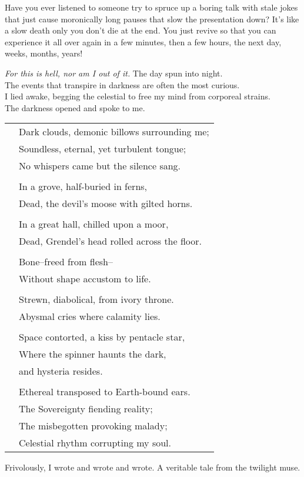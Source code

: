Have you ever listened to someone try to spruce up
a boring talk with stale jokes that just cause
moronically long pauses that slow the presentation
down?  It's like a slow death only you don't die at
the end.  You just revive so that you can experience
it all over again in a few minutes, then a few hours,
the next day, \large{}weeks, \Large{}months, \LARGE{}years!\normalsize
\VV


\textit{For this is hell, nor am I out of it.}
\lhoarb
\noindent
The day spun into night. \\
The events that transpire in darkness are often the most curious. \\
I lied awake, begging the celestial to free my mind from corporeal strains. \\
The darkness opened and spoke to me.
\vv

\singlespace
\begin{tabular}{ll}
& Dark clouds, demonic billows surrounding me; \\
& Soundless, eternal, yet turbulent tongue; \\
& No whispers came but the silence sang. \\
&\\
& In a grove, half-buried in ferns, \\
& Dead, the devil's moose with gilted horns. \\
&\\
& In a great hall, chilled upon a moor, \\
& Dead, Grendel's head rolled across the floor. \\
&\\
& Bone--freed from flesh-- \\
& Without shape accustom to life. \\
&\\
& Strewn, diabolical, from ivory throne. \\
& Abysmal cries where calamity lies. \\
&\\
& Space contorted, a kiss by pentacle star, \\
& Where the spinner haunts the dark, \\
& and hysteria resides. \\
&\\
& Ethereal transposed to Earth-bound ears. \\
& The Sovereignty fiending reality; \\
& The misbegotten provoking malady; \\
& Celestial rhythm corrupting my soul. \\
\end{tabular}
\revertspace\VV


\noindent
Frivolously, I wrote and wrote and wrote.
A veritable tale from the twilight muse.
%
%
\lhoarb
